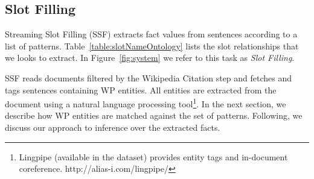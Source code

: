 \documentclass[letterpaper]{article}
\begin{document}




\subsection{Slot Filling}
\label{sec:slotfilling}
Streaming Slot Filling (SSF) extracts fact values from sentences according to a list of patterns.
Table~\ref{table:slotNameOntology} lists the slot relationships that we looks to extract.
In Figure~\ref{fig:system} we refer to this task as \textit{Slot Filling}. 





SSF reads documents filtered by the Wikipedia Citation step and fetches and tags sentences containing WP entities.
All entities are extracted from the document using a natural language processing
tool\footnote{Lingpipe (available in the dataset) provides entity tags
and in-document coreference. http://alias-i.com/lingpipe/}.
In the next section, we describe how WP entities are matched against the set of patterns.
Following, we discuss our approach to inference over the extracted facts.
\end{document}
